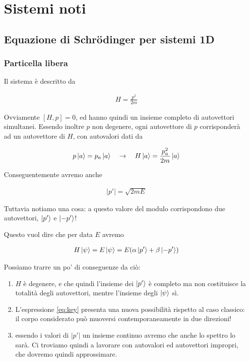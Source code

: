 \chapter{Sistemi noti}

\section{Equazione di Schrödinger per sistemi 1D}

\subsection{Particella libera}

Il sistema è descritto da

\begin{align}
H=\frac{p^2}{2m}
\end{align}

Ovviamente $[H,p]=0$, ed hanno quindi un insieme completo di autovettori simultanei. Essendo inoltre $p$ non degenere, ogni autovettore di $p$ corrisponderà ad un autovettore di $H$, con autovalori dati da

\begin{align}
p\ket{a}= p_a\ket{a} \quad \rightarrow \quad H\ket{a}= \frac{p_a^2}{2m}\ket{a}
\end{align}

Conseguentemente avremo anche

\begin{align}
|p'|= \sqrt{2mE}
\end{align}

Tuttavia notiamo una cosa: a questo valore del modulo corrispondono due autovettori, $\ket{p'}$ e $\ket{-p'}$!

Questo vuol dire che per data $E$ avremo

\begin{align}
H\ket{\psi}=E\ket{\psi}=E(\alpha\ket{p'} + \beta\ket{-p'})
\label{eq:key}
\end{align}

Possiamo trarre un po' di conseguenze da ciò:

\begin{enumerate}
	\item $H$ è degenere, e che quindi l'insieme dei $\ket{p'}$ è completo ma non costituisce la totalità degli autovettori, mentre l'insieme degli $\ket{\psi}$ sì.
	\item L'espressione \eqref{eq:key} presenta una nuova possibilità rispetto al caso classico: il corpo considerato può muoversi contemporaneamente in due direzioni!
	\item essendo i valori di $|p'|$ un insieme continuo avremo che anche lo spettro lo sarà. Ci troviamo quindi a lavorare con autovalori ed autovettori impropri, che dovremo quindi approssimare.
\end{enumerate}

